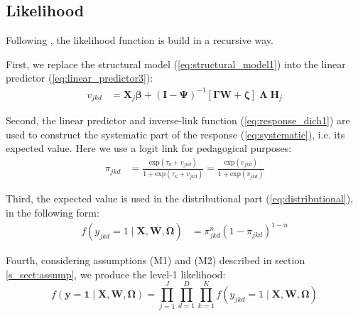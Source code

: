 \subsection{Likelihood}

Following \citet{Rabe_et_al_2004a}, the likelihood function is build in a recursive way. 

\noindent First, we replace the structural model (\ref{eq:structural_model1}) into the linear predictor (\ref{eq:linear_predictor3}):
%
\begin{equation} \label{eq:lin_pred}
	\begin{split}
		v_{jkd} &= \mathbf{X}_{j} \pmb{\beta} + ( \mathbf{I} - \pmb{\Psi} )^{-1} \left[ \pmb{\Gamma} \mathbf{W} + \pmb{\zeta} \right] \; \pmb{\Lambda} \; \mathbf{H}_{j}
	\end{split}
\end{equation}

\noindent Second, the linear predictor and inverse-link function (\ref{eq:response_dich1}) are used to construct the systematic part of the response (\ref{eq:systematic}), i.e. its expected value. Here we use a logit link for pedagogical purposes:
%
\begin{equation} \label{eq:prob}
	\begin{split}
		\pi_{jkd} &= \frac{ \text{exp}(\tau_{k} + v_{jkd}) }{ 1 + \text{exp}(\tau_{k} + v_{jkd}) } = \frac{ \text{exp}(v_{jkd}) }{ 1 + \text{exp}(v_{jkd}) }
	\end{split}	
\end{equation}

\noindent Third, the expected value is used in the distributional part (\ref{eq:distributional}), in the following form:
%
\begin{equation} \label{eq:dist}
	\begin{split}
		f \left( y_{jkd}=1 \; | \; \mathbf{X}, \mathbf{W}, \pmb{\Omega} \right) &= \pi_{jkd}^{n} (1 - \pi_{jkd})^{1-n}
	\end{split}
\end{equation}

\noindent Fourth, considering assumptions (M1) and (M2) described in section \ref{s_sect:assump}, we produce the level-1 likelihood:
%
\begin{equation} \label{eq:lik1}
	f \left( \mathbf{y}=\mathbf{1} \; | \; \mathbf{X}, \mathbf{W}, \pmb{\Omega} \right) = \prod_{j=1}^{J} \prod_{d=1}^{D} \prod_{k=1}^{K} f \left( y_{jkd}=1 \; | \; \mathbf{X}, \mathbf{W}, \pmb{\Omega} \right)
\end{equation}

